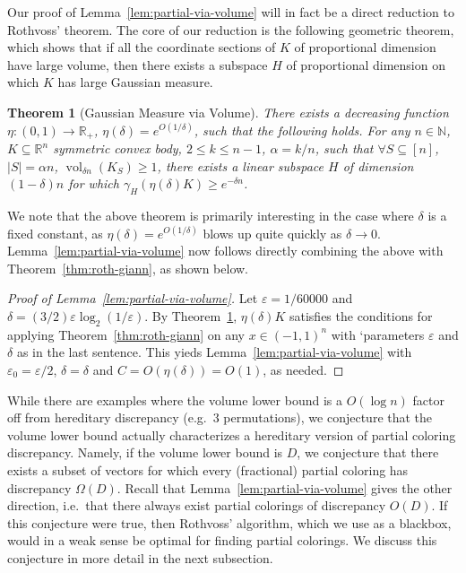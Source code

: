 \documentclass[11pt]{article}
\newtheorem{theorem}{Theorem}
\newcommand{\R}{{\mathbb{R}}}
\newcommand{\N}{{\mathbb{N}}}
\newcommand\eps{\varepsilon}
\DeclareMathOperator{\vol}{vol}
\begin{document}
Our proof of Lemma~\ref{lem:partial-via-volume} will in fact be a direct
reduction to Rothvoss' theorem. The core of our reduction is the following
geometric theorem, which shows that if all the coordinate sections of $K$ of
proportional dimension have large volume, then there exists a subspace $H$ of
proportional dimension on which $K$ has large Gaussian measure. 

\begin{theorem}[Gaussian Measure via Volume]
\label{thm:gauss-via-volume}
There exists a decreasing function $\eta: (0,1) \rightarrow \R_+$, $\eta(\delta)
= e^{O(1/\delta)}$, such that the following holds. For any $n \in \N$, $K
\subseteq \R^n$ symmetric convex body, $2 \leq k \leq n-1$, $\alpha = k/n$, such
that $\forall S \subseteq [n]$, $|S| = \alpha n$, $\vol_{\delta n}(K_S) \geq 1$,
there exists a linear subspace $H$ of dimension $(1-\delta)n$ for which
$\gamma_H(\eta(\delta) K) \geq e^{-\delta n}$.
\end{theorem}

We note that the above theorem is primarily interesting in the case where
$\delta$ is a fixed constant, as $\eta(\delta) = e^{O(1/\delta)}$ blows up quite
quickly as $\delta \rightarrow 0$. Lemma~\ref{lem:partial-via-volume} now
follows directly combining the above with Theorem~\ref{thm:roth-giann}, as shown
below.

\begin{proof}[Proof of Lemma~\ref{lem:partial-via-volume}] 
Let $\eps = 1/60000$ and $\delta = (3/2) \eps \log_2(1/\eps)$. By
Theorem~\ref{thm:gauss-via-volume}, $\eta(\delta) K$ satisfies the conditions
for applying Theorem~\ref{thm:roth-giann} on any $x \in (-1,1)^n$ with
`parameters $\eps$ and $\delta$ as in the last sentence. This yieds
Lemma~\ref{lem:partial-via-volume} with $\eps_0 = \eps/2$, $\delta = \delta$ and
$C = O(\eta(\delta)) = O(1)$, as needed.   
\end{proof}

While there are examples where the volume lower bound is a $O(\log n)$ factor
off from hereditary discrepancy (e.g.~$3$ permutations), we conjecture that the
volume lower bound actually characterizes a hereditary version of partial
coloring discrepancy. Namely, if the volume lower bound is $D$, we conjecture
that there exists a subset of vectors for which every (fractional) partial coloring
has discrepancy $\Omega(D)$. Recall that Lemma~\ref{lem:partial-via-volume}
gives the other direction, i.e.~that there always exist partial colorings of
discrepancy $O(D)$. If this conjecture were true, then Rothvoss' algorithm,
which we use as a blackbox, would in a weak sense be optimal for finding
partial colorings. We discuss this conjecture in more detail in the next
subsection. 
\end{document}

